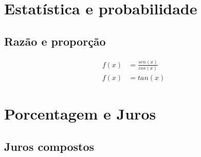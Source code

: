 \renewcommand{\sectionauthor}{Prof. Wesley Alexei}

\begin{multicols*}{2}
        
    \section*{Estatística e probabilidade}
    \lipsum[1]

    \subsection*{Razão e proporção}
    \lipsum[1-2]
    
   
    \begin{align}
        f(x) &= \frac{sen(x)}{cos(x)} \\[10pt]
        f(x) &= tan(x)
    \end{align}
    

    \newpage
    \section*{Porcentagem e Juros}
    \lipsum[1]

    \subsection*{Juros compostos}
    \lipsum[1-2]    
    
\end{multicols*}